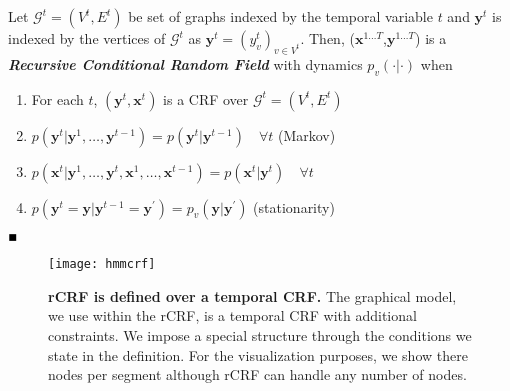 \begin{mydef}
Let $\mathcal{G}^t=(V^t,E^t)$ be set of graphs indexed by the temporal variable $t$ and $\mathbf{y}^t$ is indexed by the vertices of $\mathcal{G}^t$ as $\mathbf{y}^t=(y^t_v)_{v \in V^t}$. Then, ($\mathbf{x}^{1\ldots T}$,$\mathbf{y}^{1\ldots T}$) is a \textbf{\textit{Recursive Conditional Random Field}} with dynamics $p_v(\cdot|\cdot)$ when

\begin{enumerate}
	\item For each $t$, $(\mathbf{y}^t,\mathbf{x}^t)$ is a CRF over $\mathcal{G}^t=(V^t,E^t)$
\item $p(\mathbf{y}^{t}|\mathbf{y}^{1},\ldots,\mathbf{y}^{t-1}) = p(\mathbf{y}^{t}|\mathbf{y}^{t-1}) \quad  \forall t$ \hfill (Markov)
\item $p(\mathbf{x}^t|\mathbf{y}^1,\ldots,\mathbf{y}^t,\mathbf{x}^1,\ldots,\mathbf{x}^{t-1})=p(\mathbf{x}^t|\mathbf{y}^t)\quad  \forall t$ \hfill
\item $p(\mathbf{y}^t=\mathbf{y}|\mathbf{y}^{t-1}=\mathbf{y^\prime})=p_v(\mathbf{y}|\mathbf{y^\prime})$ \hfill (stationarity)
\end{enumerate}
$\hfill \blacksquare$
\end{mydef}
\begin{figure}[ht]
\texttt{[image: hmmcrf]}
\caption{{\bf rCRF is defined over a temporal CRF.} The graphical model, we use within the rCRF, is a temporal CRF with additional constraints. We impose a special structure through the conditions we state in the definition. For the visualization purposes, we show there nodes per segment although rCRF can handle any number of nodes.}%
\label{rCrf}
\end{figure}

